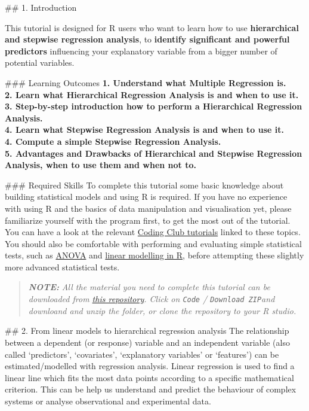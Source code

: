 \documentclass[
]{article}
\begin{document}
\#\# 1. Introduction

This tutorial is designed for R users who want to learn how to use
\textbf{hierarchical and stepwise regression analysis}, to
\textbf{identify significant and powerful predictors} influencing your
explanatory variable from a bigger number of potential variables.

\#\#\# Learning Outcomes \textbf{1. Understand what Multiple Regression
is.}\\
\textbf{2. Learn what Hierarchical Regression Analysis is and when to
use it.}\\
\textbf{3. Step-by-step introduction how to perform a Hierarchical
Regression Analysis.}\\
\textbf{4. Learn what Stepwise Regression Analysis is and when to use
it.}\\
\textbf{4. Compute a simple Stepwise Regression Analysis.}\\
\textbf{5. Advantages and Drawbacks of Hierarchical and Stepwise
Regression Analysis, when to use them and when not to.}

\#\#\# Required Skills To complete this tutorial some basic knowledge
about building statistical models and using R is required. If you have
no experience with using R and the basics of data manipulation and
visualisation yet, please familiarize yourself with the program first,
to get the most out of the tutorial. You can have a look at the relevant
\href{https://ourcodingclub.github.io/tutorials.html}{Coding Club
tutorials} linked to these topics. You should also be comfortable with
performing and evaluating simple statistical tests, such as
\href{https://ourcodingclub.github.io/tutorials/anova/}{ANOVA} and
\href{https://ourcodingclub.github.io/tutorials/model-design/}{linear
modelling in R}, before attempting these slightly more advanced
statistical tests.

\begin{quote}
\textbf{\emph{NOTE:}} \emph{All the material you need to complete this
tutorial can be downloaded from
\href{https://github.com/ourcodingclub/CC-anova}{this repository}. Click
on \texttt{Code} / \texttt{Download\ ZIP}and downloand and unzip the
folder, or clone the repository to your R studio.}
\end{quote}

\#\# 2. From linear models to hierarchical regression analysis The
relationship between a dependent (or response) variable and an
independent variable (also called `predictors', `covariates',
`explanatory variables' or `features') can be estimated/modelled with
regression analysis. Linear regression is used to find a linear line
which fits the most data points according to a specific mathematical
criterion. This can be help us understand and predict the behaviour of
complex systems or analyse observational and experimental data.
\end{document}

